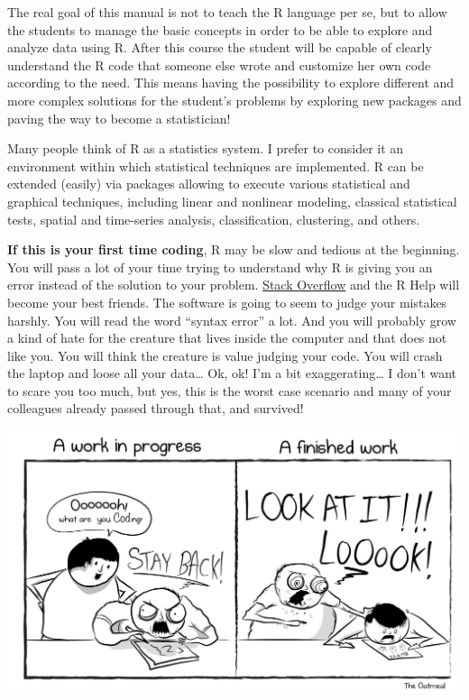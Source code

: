 \documentclass[
]{article}
\begin{document}
The real goal of this manual is not to teach the R language per se, but
to allow the students to manage the basic concepts in order to be able
to explore and analyze data using R. After this course the student will
be capable of clearly understand the R code that someone else wrote and
customize her own code according to the need. This means having the
possibility to explore different and more complex solutions for the
student's problems by exploring new packages and paving the way to
become a statistician!

Many people think of R as a statistics system. I prefer to consider it
an environment within which statistical techniques are implemented. R
can be extended (easily) via packages allowing to execute various
statistical and graphical techniques, including linear and nonlinear
modeling, classical statistical tests, spatial and time-series analysis,
classification, clustering, and others.

\textbf{If this is your first time coding}, R may be slow and tedious at the
beginning. You will pass a lot of your time trying to understand why R
is giving you an error instead of the solution to your problem. \href{https://stackoverflow.com}{Stack
Overflow} and the R Help will become your
best friends. The software is going to seem to judge your mistakes
harshly. You will read the word ``syntax error'' a lot. And you will
probably grow a kind of hate for the creature that lives inside the
computer and that does not like you. You will think the creature is
value judging your code. You will crash the laptop and loose all your
data\ldots{} Ok, ok! I'm a bit exaggerating\ldots{} I don't want to scare you too
much, but yes, this is the worst case scenario and many of your
colleagues already passed through that, and survived!

\begin{center}\includegraphics[width=0.8\linewidth,]{images/8psue2xkvn811} \end{center}
\end{document}
